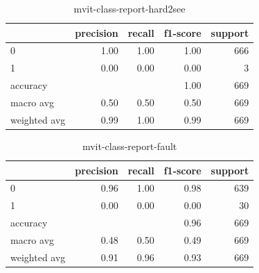 \begin{table}[h!]
    \begin{tabular}{|l|r|r|r|r|}
                \hline & precision &   recall & f1-score &  support \\ \hline
                0 &      1.00 &     1.00 &     1.00 &      666 \\
                1 &      0.00 &     0.00 &     0.00 &        3 \\ \hline
         accuracy &           &          &     1.00 &      669 \\
        macro avg &      0.50 &     0.50 &     0.50 &      669 \\
     weighted avg &      0.99 &     1.00 &     0.99 &      669 \\

         \hline
    \end{tabular}
    \caption[Hard to see class report]{mvit-class-report-hard2see}
    \label{tbl:mvit-class-report-hard2see}
\end{table}

\begin{table}[h!]
    \begin{tabular}{|l|r|r|r|r|}
                \hline & precision &   recall & f1-score &  support \\ \hline
                0 &      0.96 &     1.00 &      0.98 &       639 \\
                1 &      0.00 &     0.00 &      0.00 &        30 \\ \hline
         accuracy &           &          &      0.96 &       669 \\
        macro avg &      0.48 &     0.50 &      0.49 &       669 \\
     weighted avg &      0.91 &     0.96 &      0.93 &       669 \\
         \hline
    \end{tabular}
    \caption[Fault class report]{mvit-class-report-fault}
    \label{tbl:mvit-class-report-fault}
\end{table}
